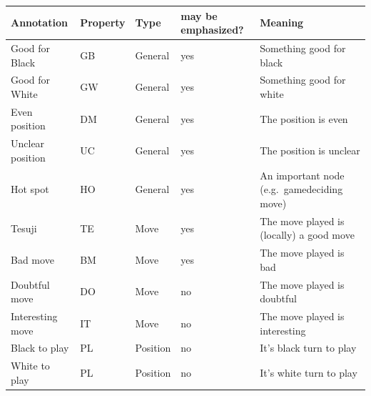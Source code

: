 {\def\LTcaptype{none} %
\begin{longtable}[]{@{}
  >{\raggedright\arraybackslash}p{}
  >{\raggedright\arraybackslash}p{}
  >{\raggedright\arraybackslash}p{}
  >{\raggedright\arraybackslash}p{}
  >{\raggedright\arraybackslash}p{}@{}}
\toprule\noalign{}
\begin{minipage}[b]{\linewidth}\raggedright
Annotation
\end{minipage} & \begin{minipage}[b]{\linewidth}\raggedright
Property
\end{minipage} & \begin{minipage}[b]{\linewidth}\raggedright
Type
\end{minipage} & \begin{minipage}[b]{\linewidth}\raggedright
may be emphasized?
\end{minipage} & \begin{minipage}[b]{\linewidth}\raggedright
Meaning
\end{minipage} \\
\midrule\noalign{}
\endhead
\bottomrule\noalign{}
\endlastfoot
Good for Black & GB & General & yes & Something good for black \\
Good for White & GW & General & yes & Something good for white \\
Even position & DM & General & yes & The position is even \\
Unclear position & UC & General & yes & The position is unclear \\
Hot spot & HO & General & yes & An important node (e.g.~gamedeciding
move) \\
Tesuji & TE & Move & yes & The move played is (locally) a good move \\
Bad move & BM & Move & yes & The move played is bad \\
Doubtful move & DO & Move & no & The move played is doubtful \\
Interesting move & IT & Move & no & The move played is interesting \\
Black to play & PL & Position & no & It's black turn to play \\
White to play & PL & Position & no & It's white turn to play \\
\end{longtable}
}


